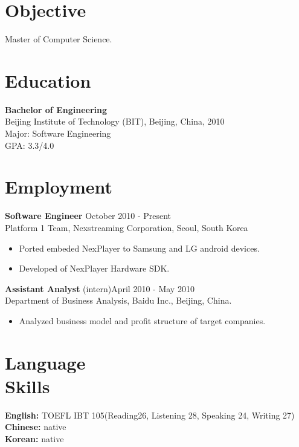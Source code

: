 \documentclass[margin]{res}
\begin{document}
\begin{resume}
 
\section{Objective}  Master of Computer Science. 

\section{Education} {\bf Bachelor of Engineering  } \\
                Beijing Institute of Technology (BIT), Beijing, China,  2010 	\\
                Major: Software Engineering \\
                GPA: 3.3/4.0
 
\section{Employment} 
				{ \bf Software Engineer} \hfill October 2010 - Present \\
                Platform 1 Team, Nexstreaming Corporation, Seoul, South Korea               
                 \begin{itemize}  \itemsep -2pt %
                 \item Ported embeded NexPlayer to Samsung and LG android devices.
                \item  Developed of NexPlayer Hardware SDK.
                \end{itemize}
 
                {\bf Assistant Analyst} (intern)\hfill            April 2010 - May 2010 \\
                Department of Business Analysis, Baidu Inc., Beijing, China. 
                 \begin{itemize}  \itemsep -2pt %
                 \item Analyzed business model and profit structure of target companies.
                 \end{itemize} 

 \section{Language \\ Skills} 
				{\bf English:} TOEFL IBT 105(Reading26, Listening 28, Speaking 24, Writing 27)\\
				{\bf Chinese:} native \\
				{\bf Korean: } native	\\	 
 

\end{resume}
\end{document}
